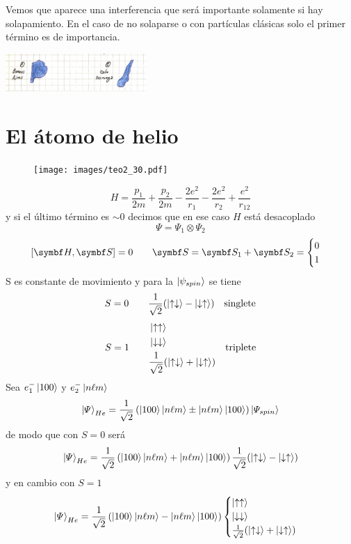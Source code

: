 \documentclass[10pt,oneside]{CBFT_book}
\begin{document}
Vemos que aparece una interferencia que será importante solamente si hay solapamiento. En el caso de no 
solaparse o con partículas clásicas solo el primer término es de importancia.

\includegraphics[width=0.4\textwidth]{images/fig_ft2_extra_identical.jpg}


\section{El átomo de helio}


\begin{figure}[htb]
	\begin{center}
	\texttt{[image: images/teo2\_30.pdf]}
	\end{center}
	\caption{}
\end{figure} 
\[
	H = \frac{p_1}{2m} + \frac{p_2}{2m} - \frac{2e^2}{r_1} -  \frac{2e^2}{r_2} + \frac{e^2}{r_{12}}
\]
y si el último término es $\sim 0$ decimos que en ese caso $H$ está desacoplado 
\[
	\Psi = \Psi_1 \otimes \Psi_2
\]
\[
	[\vb{H},\vb{S}] = 0 \qquad \vb{S} = \vb{S}_1 + \vb{S}_2 = \begin{cases} 0 \\ 1 \end{cases}
\]
S es constante de movimiento y para la $\Ket{\psi_{spin}}$ se tiene 
\[
	S=0 \qquad \frac{1}{\sqrt{2}}( \Ket{ \uparrow\downarrow }-\Ket{ \downarrow\uparrow}) \quad \text{singlete}
\]
\[
	S=1 \qquad \begin{aligned}
	& \Ket{\uparrow \uparrow} \\
	& \Ket{\downarrow \downarrow } \\
	& \frac{1}{\sqrt{2}}( \Ket{ \uparrow\downarrow }+\Ket{ \downarrow\uparrow} )
	\end{aligned} \quad \text{triplete}
\]
Sea $ e^-_1 \Ket{100}$ y $e^-_2 \Ket{n\ell m}$
\[
	\Ket{\Psi}_{He} = \frac{1}{\sqrt{2}}\left(  \Ket{100}\Ket{n\ell m} \pm  \Ket{n\ell m}\Ket{100}
	\right) \Ket{\Psi_{spin}}
\]
de modo que con $S=0$ será
\[
	\Ket{\Psi}_{He} = \frac{1}{\sqrt{2}}\left( \Ket{100}\Ket{n\ell m} + \Ket{n\ell m}\Ket{100}\right) 
	\frac{1}{\sqrt{2}}( \Ket{ \uparrow\downarrow }-\Ket{ \downarrow\uparrow})
\]
y en cambio con $S=1$
\[
	\Ket{\Psi}_{He} = \frac{1}{\sqrt{2}}\left(  \Ket{100}\Ket{n\ell m} - \Ket{n\ell m}\Ket{100}\right) 
			\begin{cases}
	                   \Ket{\uparrow \uparrow} \\
			   \Ket{\downarrow \downarrow } \\
			   \frac{1}{\sqrt{2}}( \Ket{ \uparrow\downarrow }+\Ket{ \downarrow\uparrow} )
	                  \end{cases}
\]
\end{document}
